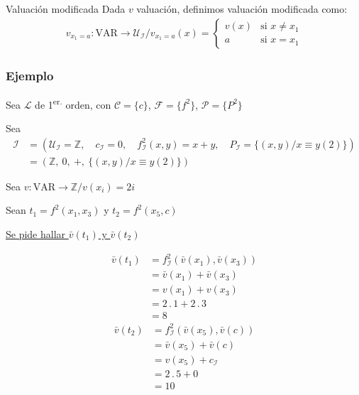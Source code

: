 \medskip

\begin{definicion}{Valuación modificada}{}
    Dada $v$ valuación, definimos valuación modificada como:
    \begin{gather*}
        v_{x_{1} = a}: \mathrm{VAR} \to \mathcal{U}_{\mathcal{I}} / 
        v_{x_{1}=a}(x) =
        \begin{cases}
            v(x) & \text{si } x \neq x_1 \\
            a & \text{si } x = x_1
        \end{cases}
    \end{gather*}
\end{definicion}

\subsubsection{Ejemplo}

Sea $\mathcal{L}$ de 1\textsuperscript{er.} orden, con $\mathcal{C}=\{c\}$,
$\mathcal{F}=\{ f^{2} \}$, $\mathcal{P}=\{ P^{2} \}$

Sea 
\begin{align*}
    \mathcal{I} &= (\mathcal{U}_{\mathcal{I}} = \mathbb{Z}, \quad
            c_{\mathcal{I}} = 0, \quad
            f_{\mathcal{I}}^2 (x,y) = x+y, \quad
            P_{\mathcal{I}} = \{ (x,y)/ x \equiv y (2) \}
    ) \\
    &= ( \mathbb{Z}, ~
    0, ~
    +, ~
    \{ (x,y) / x \equiv y (2) \} )
\end{align*}

Sea $v: \mathrm{VAR} \to \mathbb{Z} / v(x_i) = 2i$

Sean $t_1 = f^{2} (x_1, x_3)$ y $t_2 = f^{2} (x_5, c)$

\underline{Se pide hallar $\bar{v}(t_1)$ y $\bar{v} (t_2)$}

\medskip

\begin{align*}
    \bar{v}(t_1) &= f_{\mathcal{I}}^{2}(\bar{v}(x_1), \bar{v}(x_3)) \\
                 &= \bar{v}(x_1) + \bar{v}(x_3) \\
                 &= v(x_1) + v(x_3) \\
                 &= 2\, . \, 1 + 2 \, . \, 3 \\
                 &= 8 
\end{align*}
\begin{align*}
    \bar{v}(t_2) &= f_{\mathcal{I}}^{2}(\bar{v}(x_5), \bar{v}(c)) \\
                 &= \bar{v}(x_5) + \bar{v}(c) \\
                 &= v(x_5) + c_{\mathcal{I}} \\ 
                 &= 2\, . \, 5 + 0 \\
                 &= 10
\end{align*}

